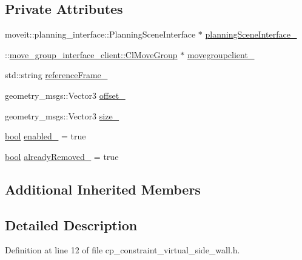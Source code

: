 \subsection*{Private Attributes}
\begin{DoxyCompactItemize}
\item 
moveit\+::planning\+\_\+interface\+::\+Planning\+Scene\+Interface $\ast$ \hyperlink{classsm__moveit__4_1_1move__group__interface__client_1_1CpConstraintVirtualSideWall_aa31132f6c2b476dafde6825090309498}{planning\+Scene\+Interface\+\_\+}
\item 
\+::\hyperlink{classmove__group__interface__client_1_1ClMoveGroup}{move\+\_\+group\+\_\+interface\+\_\+client\+::\+Cl\+Move\+Group} $\ast$ \hyperlink{classsm__moveit__4_1_1move__group__interface__client_1_1CpConstraintVirtualSideWall_a8b3a32ceb9486f939030e54dd8223217}{movegroupclient\+\_\+}
\item 
std\+::string \hyperlink{classsm__moveit__4_1_1move__group__interface__client_1_1CpConstraintVirtualSideWall_a9eebbc3d7b58367c509ec93eae81b2b0}{reference\+Frame\+\_\+}
\item 
geometry\+\_\+msgs\+::\+Vector3 \hyperlink{classsm__moveit__4_1_1move__group__interface__client_1_1CpConstraintVirtualSideWall_a5bf697ee83d01d56871552148b4a3004}{offset\+\_\+}
\item 
geometry\+\_\+msgs\+::\+Vector3 \hyperlink{classsm__moveit__4_1_1move__group__interface__client_1_1CpConstraintVirtualSideWall_aa460120f216e58206aaec0cf864ad55b}{size\+\_\+}
\item 
\hyperlink{classbool}{bool} \hyperlink{classsm__moveit__4_1_1move__group__interface__client_1_1CpConstraintVirtualSideWall_a14d8cbbcc4b6f3fa158959b1eb1adc0f}{enabled\+\_\+} = true
\item 
\hyperlink{classbool}{bool} \hyperlink{classsm__moveit__4_1_1move__group__interface__client_1_1CpConstraintVirtualSideWall_a5b11a3fcd2ead0a3ea7fe94fdec3747c}{already\+Removed\+\_\+} = true
\end{DoxyCompactItemize}
\subsection*{Additional Inherited Members}


\subsection{Detailed Description}


Definition at line 12 of file cp\+\_\+constraint\+\_\+virtual\+\_\+side\+\_\+wall.\+h.



